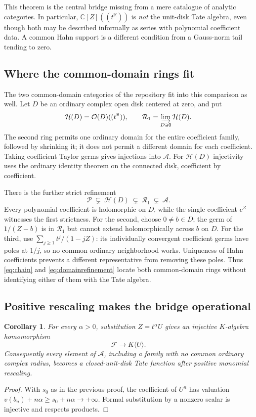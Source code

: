 \documentclass[11pt,a4paper]{article}
\numberwithin{equation}{section}
\newtheorem{corollary}[theorem]{Corollary}
\theoremstyle{definition}
\theoremstyle{remark}
\newcommand{\C}{\mathbb C}
\newcommand{\R}{\mathbb R}
\newcommand{\OO}{\mathcal O}
\newcommand{\PP}{\mathcal P}
\newcommand{\Ag}{\mathcal A}
\newcommand{\FF}{\mathcal F}
\begin{document}
This theorem is the central bridge missing from a mere catalogue of analytic
categories. In particular, $\C[Z]((t^\R))$ is \emph{not} the unit-disk Tate
algebra, even though both may be described informally as series with polynomial
coefficient data. A common Hahn support is a different condition from a
Gauss-norm tail tending to zero.

\subsection{Where the common-domain rings fit}
The two common-domain categories of the repository fit into this comparison as
well. Let $D$ be an ordinary complex open disk centered at zero, and put
\[
 \mathcal H(D)=\OO(D)((t^\R)),\qquad
 \mathcal R_1=\varinjlim_{D\ni0}\mathcal H(D).
\]
The second ring permits one ordinary domain for the entire coefficient family,
followed by shrinking it; it does not permit a different domain for each
coefficient. Taking coefficient Taylor germs gives injections into $\Ag$.
For $\mathcal H(D)$ injectivity uses the ordinary identity theorem on the
connected disk, coefficient by coefficient.

There is the further strict refinement
\begin{equation}\label{eq:domainrefinement}
 \PP\ \varsubsetneq\ \mathcal H(D)\ \varsubsetneq\ \mathcal R_1
 \ \varsubsetneq\ \Ag.
\end{equation}
Every polynomial coefficient is holomorphic on $D$, while the single
coefficient $e^Z$ witnesses the first strictness. For the second, choose
$0\ne b\in D$; the germ of $1/(Z-b)$ is in $\mathcal R_1$ but cannot extend
holomorphically across $b$ on $D$. For the third, use
$\sum_{j\ge1}t^j/(1-jZ)$: its individually convergent coefficient germs have
poles at $1/j$, so no common ordinary neighborhood works. Uniqueness of Hahn
coefficients prevents a different representative from removing these poles.
Thus \eqref{eq:chain} and \eqref{eq:domainrefinement} locate both common-domain
rings without identifying either of them with the Tate algebra.

\subsection{Positive rescaling makes the bridge operational}
\begin{corollary}\label{cor:rescale}
For every $\alpha>0$, substitution $Z=t^\alpha U$ gives an injective
$K$-algebra homomorphism
\[
 \FF\longrightarrow K\langle U\rangle.
\]
Consequently every element of $\Ag$, including a family with no common ordinary
complex radius, becomes a closed-unit-disk Tate function after positive
monomial rescaling.
\end{corollary}
\begin{proof}
With $s_0$ as in the previous proof, the coefficient of $U^n$ has valuation
$v(b_n)+n\alpha\ge s_0+n\alpha\to+\infty$. Formal substitution by a nonzero
scalar is injective and respects products.
\end{proof}
\end{document}
